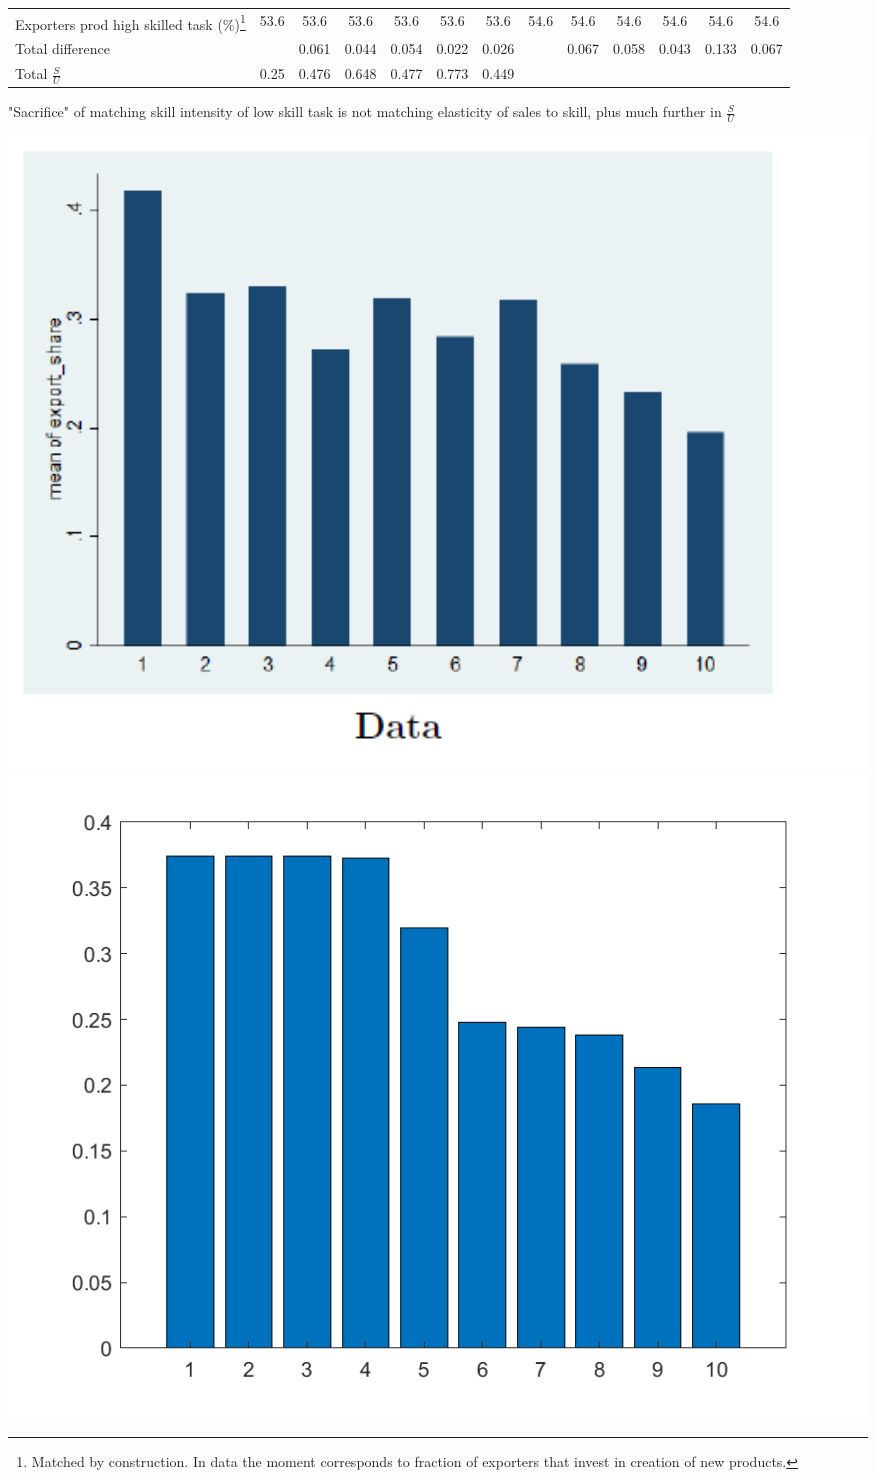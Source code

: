 \documentclass[12pt]{article}
\begin{document}
\begin{landscape}
\begin{center}
\begin{tabular}{ l c c c c c c c c c c c c  }
Exporters prod high skilled task (\%)\footnote{Matched by construction. In data the moment corresponds to fraction of exporters that invest in creation of new products. }  & 53.6 & 53.6 & 53.6 & 53.6 & 53.6 & 53.6 & 54.6 & 54.6 & 54.6 & 54.6 & 54.6 &  54.6 \\ \bigskip
Total difference & &0.061 & 0.044 & 0.054 & 0.022 & 0.026 & & 0.067 & 0.058 & 0.043 & 0.133 & 0.067 \\ \bigskip
Total $\frac{S}{U}$ & 0.25 & 0.476 & 0.648 & 0.477 & 0.773 & 0.449 & & & & & & \\ \hline
\end{tabular}
\end{center}
\end{landscape}

{\color{red}"Sacrifice" of matching skill intensity of low skill task is not matching elasticity of sales to skill, plus much further in $\frac{S}{U}$}



\centering
\includegraphics[width=1.0\textwidth]{DataXShareSkin.png}
\includegraphics[width=1.0\textwidth]{grXSh_bySkint_modd1.png}
\end{document}
